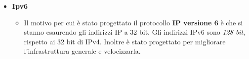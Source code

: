 \begin{itemize}
\begin{itemize}
        \end{itemize}
    \item \textbf{Ipv6}
        \begin{itemize}
            \item Il motivo per cui è stato progettato il protocollo \textbf{IP versione 6} è che si stanno esaurendo gli indirizzi IP a 32 bit. Gli indirizzi IPv6 sono \textit{128 bit}, rispetto ai 32 bit di IPv4. Inoltre è stato progettato per migliorare l'infrastruttura generale e velocizzarla.
        \end{itemize}
\end{itemize}
